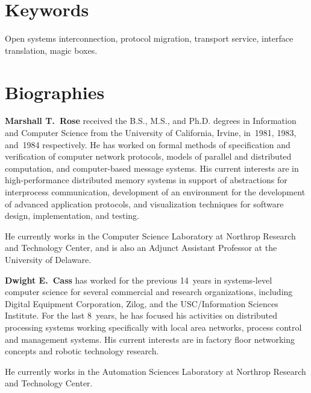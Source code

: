 





\section*	{Keywords}
Open systems interconnection,
protocol migration,
transport service,
interface translation,
magic boxes.


\section*	{Biographies}
{\bf Marshall T.~Rose} received the B.S., M.S., and Ph.D. degrees in
Information and Computer Science from the University of California, Irvine,
in~1981, 1983, and~1984 respectively.
He has worked on formal methods of specification
and verification of computer network protocols,
models of parallel and distributed computation,
and computer-based message systems.
His current interests are in high-performance distributed memory systems in
support of abstractions for interprocess communication,
development of an environment for the development of advanced application
protocols,
and visualization techniques for software design, implementation, and testing.

He currently works in the Computer Science Laboratory at
Northrop Research and Technology Center,
and is also an Adjunct Assistant Professor at the University of Delaware.

\vspace{0.25in}

{\bf Dwight E.~Cass} has worked for the previous 14~years in systems-level
computer science for several commercial and research organizations,
including Digital Equipment Corporation,
Zilog,
and the USC/Information Sciences Institute.
For the last 8~years,
he has focused his activities on distributed processing systems
working specifically with local area networks,
process control and management systems.
His current interests are in factory floor networking concepts
and robotic technology research.

He currently works in the Automation Sciences Laboratory at Northrop Research
and Technology Center.

